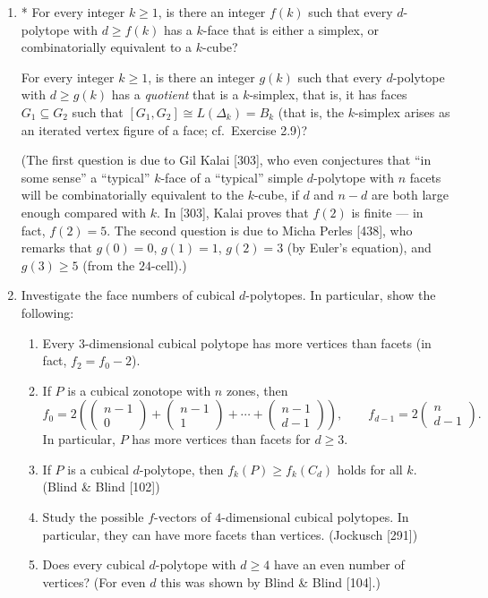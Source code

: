 \documentclass{article}
\begin{document}
\begin{enumerate}
\item* For every integer $k\ge 1$, is there an integer $f(k)$ such that every $d$-polytope with $d\ge f(k)$ has a $k$-face that is either a simplex, or combinatorially equivalent to a $k$-cube? 

For every integer $k\ge 1$, is there an integer $g(k)$ such that every $d$-polytope with $d\ge g(k)$ has a \emph{quotient} that is a $k$-simplex, that is, it has faces $G_1\subseteq G_2$ such that $[G_1,G_2]\cong L(\Delta_k)=B_k$ (that is, the $k$-simplex arises as an iterated vertex figure of a face; cf.\ Exercise 2.9)? 

(The first question is due to Gil Kalai [303], who even conjectures that ``in some sense'' a ``typical'' $k$-face of a ``typical'' simple $d$-polytope with $n$ facets will be combinatorially equivalent to the $k$-cube, if $d$ and $n-d$ are both large enough compared with $k$. In [303], Kalai proves that $f(2)$ is finite --- in fact, $f(2)=5$. The second question is due to Micha Perles [438], who remarks that $g(0)=0$, $g(1)=1$, $g(2)=3$ (by Euler's equation), and $g(3)\ge 5$ (from the $24$-cell).)

\item Investigate the face numbers of cubical $d$-polytopes. In particular, show the following:
\begin{enumerate}[label=(\roman*)]
\item Every $3$-dimensional cubical polytope has more vertices than facets (in fact, $f_2=f_0-2$).
\item If $P$ is a cubical zonotope with $n$ zones, then
\[
f_0 = 2\left(\begin{pmatrix} n-1 \\ 0 \end{pmatrix}+\begin{pmatrix} n-1 \\ 1 \end{pmatrix}+\cdots+\begin{pmatrix} n-1 \\ d-1 \end{pmatrix}\right),
\qquad
f_{d-1}=2\begin{pmatrix} n \\ d-1 \end{pmatrix}.
\]
In particular, $P$ has more vertices than facets for $d\ge 3$.
\item If $P$ is a cubical $d$-polytope, then $f_k(P)\ge f_k(C_d)$ holds for all $k$. (Blind \& Blind [102])
\item Study the possible $f$-vectors of $4$-dimensional cubical polytopes. In particular, they can have more facets than vertices. (Jockusch [291])
\item[(v)*] Does every cubical $d$-polytope with $d\ge 4$ have an even number of vertices? (For even $d$ this was shown by Blind \& Blind [104].)
\end{enumerate}


\end{enumerate}
\end{document}
